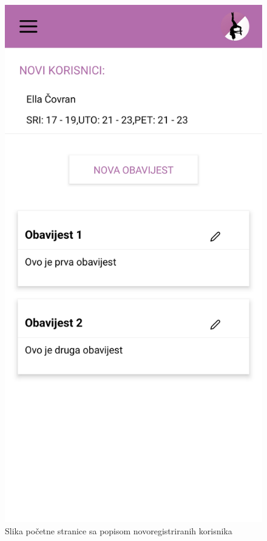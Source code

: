 \documentclass[times, utf8, zavrsni]{fer}
\begin{document}
			\begin{figure}[H]
        			\includegraphics[scale=0.2]{slike/App_novi_korisnici_i_obavijesti.jpg}
        			\centering
        			\caption{Slika početne stranice sa popisom novoregistriranih korisnika}
        			\label{fig:promjene}
        		\end{figure}
        		
\end{document}
